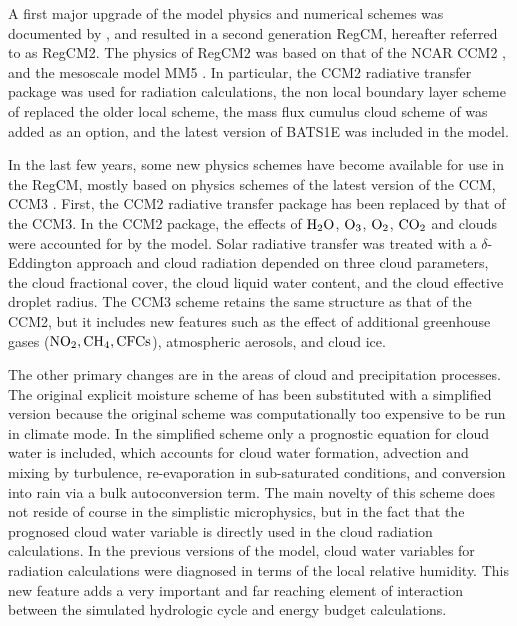 A first major upgrade of the model physics and numerical schemes was documented
by \citep{Giorgi_93,Giorgi_93b}, and resulted in a second generation \ac{RegCM},
hereafter referred to as \ac{RegCM2}. The physics of \ac{RegCM2} was based on
that of the \ac{NCAR} \ac{CCM2} \citep{Hack_93}, and the mesoscale model
\ac{MM5} \citep{Grell_94}. In particular, the \ac{CCM2} radiative transfer
package \citep{Briegleb_92} was used for radiation calculations, the non local
boundary layer scheme of \citep{Holtslag_90} replaced the older local scheme,
the mass flux cumulus cloud scheme of \citep{Grell_93} was added as an option,
and the latest version of BATS1E \citep{Dickinson_93} was included in the model.

In the last few years, some new physics schemes have become available for use in
the \ac{RegCM}, mostly based on physics schemes of the latest version of the
\ac{CCM}, \ac{CCM3} \citep{Kiehl_96}. First, the \ac{CCM2} radiative transfer
package has been replaced by that of the \ac{CCM3}. In the \ac{CCM2} package,
the effects of ${\rm H_2O}$, ${\rm O_3}$, ${\rm O_2}$, ${\rm CO_2}$ and clouds
were accounted for by the model. Solar radiative transfer was treated with a
$\delta$-Eddington approach and cloud radiation depended on three cloud
parameters, the cloud fractional cover, the cloud liquid water content, and the
cloud effective droplet radius. The \ac{CCM3} scheme retains the same structure
as that of the \ac{CCM2}, but it includes new features such as the effect of
additional greenhouse gases (${\rm NO_2, CH_4, CFCs}$), atmospheric aerosols,
and cloud ice.
 
The other primary changes are in the areas of cloud and precipitation processes.
The original explicit moisture scheme of \citet{Hsie_84} has been substituted
with a simplified version because the original scheme was computationally too
expensive to be run in climate mode. In the simplified scheme only a prognostic
equation for cloud water is included, which accounts for cloud water formation,
advection and mixing by turbulence, re-evaporation in sub-saturated conditions,
and conversion into rain via a bulk autoconversion term. The main novelty of
this scheme does not reside of course in the simplistic microphysics, but in the
fact that the prognosed cloud water variable is directly used in the cloud
radiation calculations. In the previous versions of the model, cloud water
variables for radiation calculations were diagnosed in terms of the local
relative humidity. This new feature adds a very important and far reaching
element of interaction between the simulated hydrologic cycle and energy budget
calculations. 

